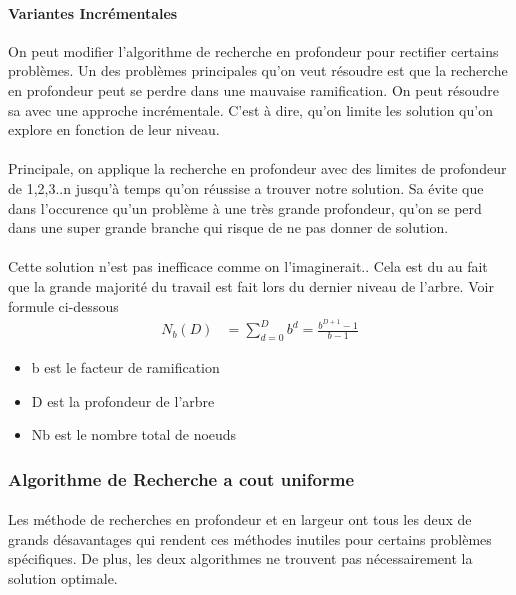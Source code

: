 \documentclass{book}
\begin{document}
\paragraph{Variantes Incrémentales}
On peut modifier l'algorithme de recherche en profondeur pour rectifier certains problèmes. Un des problèmes principales qu'on veut résoudre est que la recherche en profondeur peut se perdre dans une mauvaise ramification. On peut résoudre sa avec une approche incrémentale. C'est à dire, qu'on limite les solution qu'on explore en fonction de leur niveau.
\paragraph{}
Principale, on applique la recherche en profondeur avec des limites de profondeur de 1,2,3..n jusqu'à temps qu'on réussise a trouver notre solution. Sa évite que dans l'occurence qu'un problème à une très grande profondeur, qu'on se perd dans une super grande branche qui risque de ne pas donner de solution.
\paragraph{}
Cette solution n'est pas inefficace comme on l'imaginerait.. Cela est du au fait que la grande majorité du travail est fait lors du dernier niveau de l'arbre. Voir formule ci-dessous
\begin{align*}
N_{b}(D) &= \sum^D_{d=0} b^d = \frac{b^{D+1}-1}{b-1}
\end{align*}

\begin{itemize}
\centering
\item {b est le facteur de ramification}
\item {D est la profondeur de l'arbre}
\item {Nb est le nombre total de noeuds}

\end{itemize}

\subsubsection{Algorithme de Recherche a cout uniforme}

\paragraph{}
Les méthode de recherches en profondeur et en largeur ont tous les deux de grands désavantages qui rendent ces méthodes inutiles pour certains problèmes spécifiques. De plus, les deux algorithmes ne trouvent pas nécessairement la solution optimale.
\end{document}
